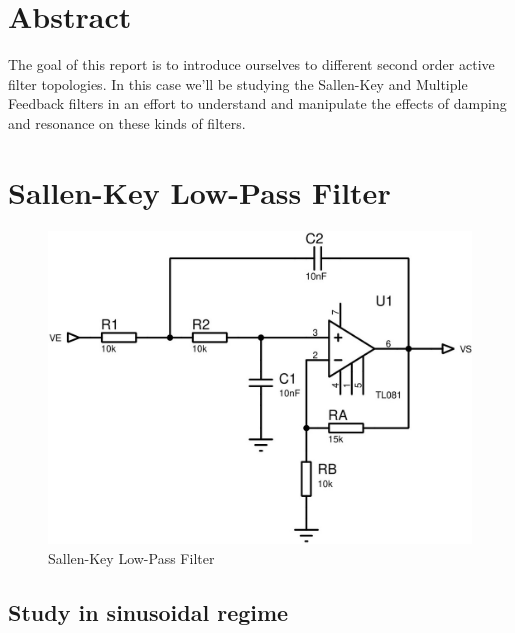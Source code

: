 \documentclass[11pt, openright]{book}
\begin{document}




\vspace*{\fill}

\section{Abstract}

The goal of this report is to introduce ourselves to different second order active filter topologies. In this case we'll be studying the Sallen-Key and Multiple Feedback filters in an effort to understand and manipulate the effects of damping and resonance on these kinds of filters. 

\newpage

\section{Sallen-Key Low-Pass Filter}


\begin{figure}[ht]
  \centering
  \includegraphics{./Circuits/C1.jpeg}
  \caption{Sallen-Key Low-Pass Filter}
\end{figure}

\subsection{Study in sinusoidal regime}
\end{document}
